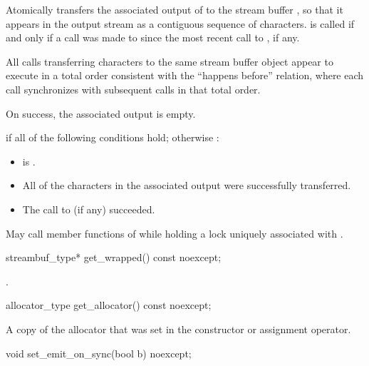 \begin{itemdescr}
\pnum
\effects
Atomically transfers the associated output of 
to the stream buffer ,
so that it appears in the output stream
as a contiguous sequence of characters.
 is called
if and only if a call was made to 
since the most recent call to , if any.

\pnum
\sync
All  calls transferring characters
to the same stream buffer object
appear to execute in a total order
consistent with the ``happens before'' relation,
where each  call
synchronizes with
subsequent  calls in that total order.

\pnum
\ensures
On success, the associated output is empty.

\pnum
\returns
{} if all of the following conditions hold;
otherwise :
\begin{itemize}
\item {} is .
\item All of the characters in the associated output were successfully transferred.
\item The call to  (if any) succeeded.
\end{itemize}

\pnum
\remarks
May call member functions of 
while holding a lock uniquely associated with .
\end{itemdescr}

%
\begin{itemdecl}
streambuf_type* get_wrapped() const noexcept;
\end{itemdecl}

\begin{itemdescr}
\pnum
\returns
{}.
\end{itemdescr}

%
\begin{itemdecl}
allocator_type get_allocator() const noexcept;
\end{itemdecl}

\begin{itemdescr}
\pnum
\returns
A copy of the allocator that was set in the constructor or assignment operator.
\end{itemdescr}

%
\begin{itemdecl}
void set_emit_on_sync(bool b) noexcept;
\end{itemdecl}

